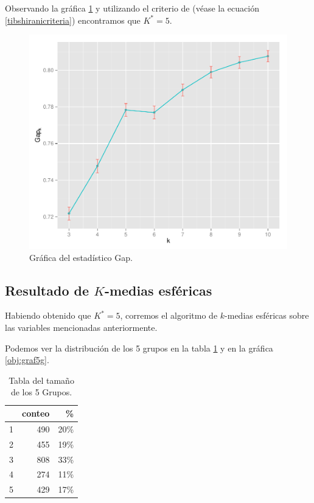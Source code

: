 Observando la gráfica \ref{obj:gapplot} y utilizando el criterio de \citet{hastie09} (véase la ecuación \ref{tibshiranicriteria}) encontramos que $K^*=5$.


\begin{figure}[!ht]
  \centering
  \caption{Gráfica del estadístico Gap. \label{obj:gapplot} }
  \includegraphics[width=.7\textwidth]{./plots/gap_plot.pdf}
\end{figure}

\subsection{Resultado de $K$-medias esféricas}
Habiendo obtenido que $K^*=5$, corremos el algoritmo de $k$-medias esféricas sobre las variables mencionadas anteriormente.

Podemos ver la distribución de  los 5 grupos en la tabla \ref{tabla5g} y en la gráfica \ref{obj:graf5g}.

\begin{table}[!ht]
\centering
\begin{tabular}{rrr}
  \hline
    & conteo & \% \\ 
  \hline
  1 & 490 & 20\% \\ 
  2 & 455 & 19\% \\ 
  3 & 808 & 33\% \\ 
  4 & 274 & 11\% \\ 
  5 & 429 & 17\% \\ 
   \hline
\end{tabular}
\caption{Tabla del tamaño de los 5 Grupos. \label{tabla5g}}
\end{table}

